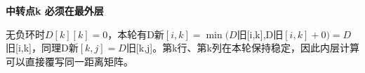 {\color{ink}\bfseries 中转点k 必须在最外层}\par\vspace{1bp}无负环时\(D[k][k]=\allowbreak{}0\)，本轮有D新\([i,\allowbreak{}k]=\allowbreak{}\operatorname{min}(D\)旧[i,\allowbreak{}k],\allowbreak{}D旧\([i,\allowbreak{}k]+\allowbreak{}0)=\allowbreak{}D\)旧[i,\allowbreak{}k]，同理D新\([k,\allowbreak{}j]=\allowbreak{}D\)旧[k,\allowbreak{}j]。第k行、第k列在本轮保持稳定，因此内层计算可以直接覆写同一距离矩阵。
